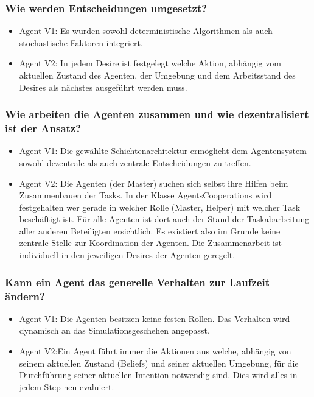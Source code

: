 \documentclass[runningheads]{llncs}
\begin{document}
	\subsubsection{Wie werden Entscheidungen umgesetzt?}
	\begin{itemize}
		\item Agent V1: Es wurden sowohl deterministische Algorithmen als auch stochastische Faktoren integriert.
		\item Agent V2: In jedem Desire ist festgelegt welche Aktion, abhängig vom aktuellen Zustand des Agenten, der Umgebung und dem Arbeitsstand des Desires als nächstes ausgeführt werden muss.
	\end{itemize}
	
	\subsubsection{Wie arbeiten die Agenten zusammen und wie dezentralisiert ist der Ansatz?}
	\begin{itemize}
		\item Agent V1: Die gewählte Schichtenarchitektur ermöglicht dem Agentensystem sowohl dezentrale als auch zentrale Entscheidungen zu treffen.
		\item Agent V2: Die Agenten (der Master) suchen sich selbst ihre Hilfen beim Zusammenbauen der Tasks. In der Klasse AgentsCooperations wird festgehalten wer gerade in welcher Rolle (Master, Helper) mit welcher Task beschäftigt ist. Für alle Agenten ist dort auch der Stand der Taskabarbeitung aller anderen Beteiligten ersichtlich. Es existiert also im Grunde keine zentrale Stelle zur Koordination der Agenten. Die Zusammenarbeit ist individuell in den jeweiligen Desires der Agenten geregelt.
	\end{itemize}
	
	\subsubsection{Kann ein Agent das generelle Verhalten zur Laufzeit ändern?}
	\begin{itemize}
		\item Agent V1: Die Agenten besitzen keine festen Rollen. Das Verhalten wird dynamisch an das Simulationsgeschehen angepasst.
		\item Agent V2:Ein Agent führt immer die Aktionen aus welche, abhängig von seinem aktuellen Zustand (Beliefs) und seiner aktuellen Umgebung, für die Durchführung seiner aktuellen Intention notwendig sind. Dies wird alles in jedem Step neu evaluiert.
	\end{itemize}
	
\end{document}
